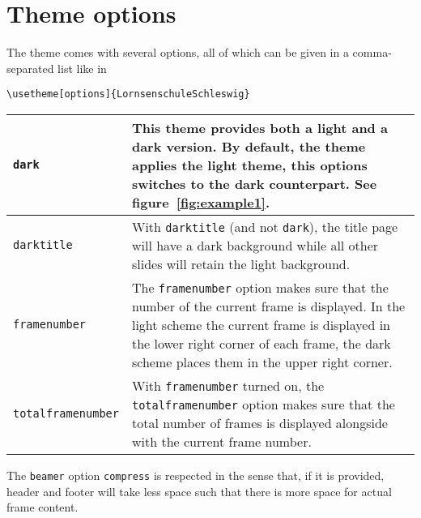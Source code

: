 \section{Theme options}

The theme comes with several options, all of which can be given in a
comma-separated list like in
\begin{lstlisting}
\usetheme[options]{LornsenschuleSchleswig}
\end{lstlisting}

\begin{center}
\begin{tabulary}{12cm}{p{3cm}L}\toprule
\lstinline!dark!
&
This theme provides both a light and a dark version.
By default, the theme applies the light theme, this options switches
to the dark counterpart. See figure~\ref{fig:example1}.\\\midrule
\lstinline!darktitle!
&
With \lstinline!darktitle! (and not \lstinline!dark!), the title page will have
a dark background while all other slides will retain the light
background.\\\midrule
\lstinline!framenumber!
&
The \lstinline!framenumber! option makes sure that the number of the current
frame is displayed. In the light scheme the current frame is displayed in the
lower right corner of each frame, the dark scheme places them in the upper
right corner.\\\midrule
\lstinline!totalframenumber!
&
With \lstinline!framenumber! turned on, the \lstinline!totalframenumber! option
makes sure that the total number of frames is displayed alongside with the
current frame number.\\\bottomrule
\end{tabulary}
\end{center}

\begin{note}
The \texttt{beamer} option \lstinline!compress! is respected in the sense that,
if it is provided, header and footer will take less space such that there is
more space for actual frame content.
\end{note}
